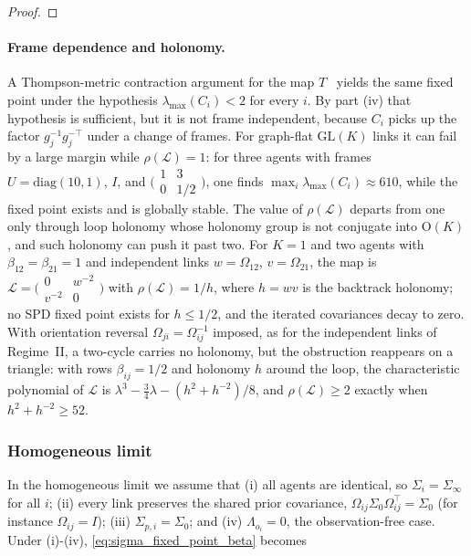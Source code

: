 \begin{proof}
\end{proof}

\paragraph{Frame dependence and holonomy.} A Thompson-metric contraction argument for the map $T$~\cite{nussbaum1988hilbert, lawson2001geometric} yields the same fixed point under the hypothesis $\lambda_{\max}(C_i) < 2$ for every $i$. By part (iv) that hypothesis is sufficient, but it is not frame independent, because $C_i$ picks up the factor $g_j^{-1}g_j^{-\top}$ under a change of frames. For graph-flat $\mathrm{GL}(K)$ links it can fail by a large margin while $\rho(\mathcal{L}) = 1$: for three agents with frames $U = \mathrm{diag}(10, 1)$, $I$, and $\bigl(\begin{smallmatrix}1 & 3\\ 0 & 1/2\end{smallmatrix}\bigr)$, one finds $\max_i\lambda_{\max}(C_i) \approx 610$, while the fixed point exists and is globally stable. The value of $\rho(\mathcal{L})$ departs from one only through loop holonomy whose holonomy group is not conjugate into $\mathrm{O}(K)$, and such holonomy can push it past two. For $K = 1$ and two agents with $\beta_{12} = \beta_{21} = 1$ and independent links $w = \Omega_{12}$, $v = \Omega_{21}$, the map is $\mathcal{L} = \bigl(\begin{smallmatrix}0 & w^{-2}\\ v^{-2} & 0\end{smallmatrix}\bigr)$ with $\rho(\mathcal{L}) = 1/h$, where $h = wv$ is the backtrack holonomy; no SPD fixed point exists for $h \leq 1/2$, and the iterated covariances decay to zero. With orientation reversal $\Omega_{ji} = \Omega_{ij}^{-1}$ imposed, as for the independent links of Regime~II, a two-cycle carries no holonomy, but the obstruction reappears on a triangle: with rows $\beta_{ij} = 1/2$ and holonomy $h$ around the loop, the characteristic polynomial of $\mathcal{L}$ is $\lambda^3 - \tfrac{3}{4}\lambda - (h^2 + h^{-2})/8$, and $\rho(\mathcal{L}) \geq 2$ exactly when $h^2 + h^{-2} \geq 52$.

\subsubsection{Homogeneous limit}

In the homogeneous limit we assume that (i) all agents are identical, so $\Sigma_i = \Sigma_\infty$ for all $i$; (ii) every link preserves the shared prior covariance, $\Omega_{ij}\Sigma_0\Omega_{ij}^\top = \Sigma_0$ (for instance $\Omega_{ij} = I$); (iii) $\Sigma_{p,i} = \Sigma_0$; and (iv) $\Lambda_{o_i} = 0$, the observation-free case. Under (i)-(iv), \eqref{eq:sigma_fixed_point_beta} becomes

